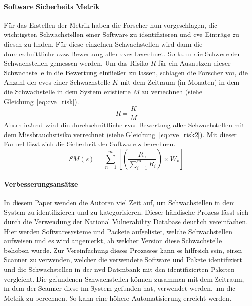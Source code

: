\documentclass[12pt, a4paper, ngerman]{article}
\begin{document}
\paragraph{Software Sicherheits Metrik}

Für das Erstellen der Metrik haben die Forscher nun vorgeschlagen, 
die wichtigsten Schwachstellen einer Software zu identifizieren und \ac{cve} Einträge zu diesen zu finden.
Für diese einzelnen Schwachstellen wird dann die durchschnittliche \ac{cvss} Bewertung aller \ac{cve}s berechnet.
So kann die Schwere der Schwachstellen gemessen werden.
Um das Risiko \(R\) für ein Ausnutzen dieser Schwachstelle in die Bewertung einfließen zu lassen, 
schlagen die Forscher vor, die Anzahl der \ac{cve}s einer Schwachstelle \(K\) mit dem Zeitraum (in Monaten) in dem die Schwachstelle in dem System existierte \(M\) zu verrechnen (siehe Gleichung~\ref{eq:cve_risk}).
\begin{equation} \label{eq:cve_risk}
  R = \frac{ K }{ M }
\end{equation}
Abschließend wird die durchschnittliche \ac{cvss} Bewertung aller Schwachstellen mit dem Missbrauchsrisiko verrechnet (siehe Gleichung~\ref{eq:cve_risk2}).
Mit dieser Formel lässt sich die Sicherheit der Software \(s\) berechnen.
\begin{equation} \label{eq:cve_risk2}
  SM \left( s \right) = \sum_{ n=1 }^{ m }{ \left[ \left( \frac{ R_{ n } }{ \sum_{ i=1 }^{ m }{ R_{ i } } } \right) \times W_{ n } \right] }
\end{equation}

\paragraph{Verbesserungsansätze}
In diesem Paper wenden die Autoren viel Zeit auf, um Schwachstellen in dem System zu identifizieren und zu kategorisieren.
Dieser händische Prozess lässt sich durch die Verwendung der National Vulnerability Database deutlich vereinfachen.
Hier werden Softwaresysteme und Packete aufgelistet, welche Schwachstellen aufweisen und 
es wird angemerkt, ab welcher Version diese Schwachstelle behoben wurde.
Zur Vereinfachung dieses Prozesses kann es hilfreich sein, einen Scanner zu verwenden, 
welcher die verwendete Software und Pakete identifiziert und 
die Schwachstellen in der \ac{nvd} Datenbank mit den identifizierten Paketen vergleicht.
Die gefundenen Schwachstellen können zusammen mit dem Zeitraum, 
in dem der Scanner diese im System gefunden hat, verwendet werden, um die Metrik zu berechnen.
So kann eine höhere Automatisierung erreicht werden.
\end{document}
